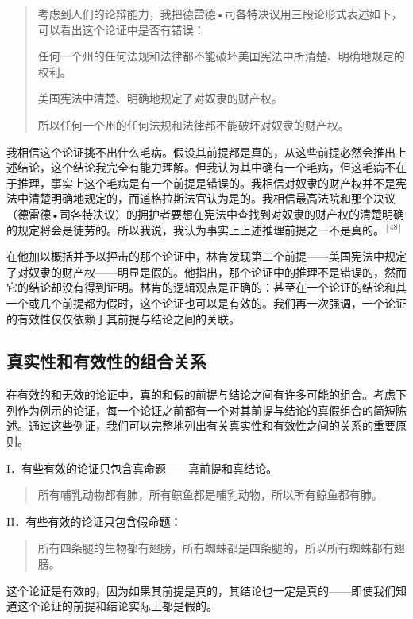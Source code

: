 \begin{quotation}
考虑到人们的论辩能力，我把德雷德•司各特决议用三段论形式表述如下，可以看出这个论证中是否有错误：

任何一个州的任何法规和法律都不能破坏美国宪法中所清楚、明确地规定的权利。

美国宪法中清楚、明确地规定了对奴隶的财产权。

所以任何一个州的任何法规和法律都不能破坏对奴隶的财产权。
\end{quotation}

我相信这个论证挑不出什么毛病。假设其前提都是真的，从这些前提必然会推出上述结论，这个结论我完全有能力理解。但我认为其中确有一个毛病，但这毛病不在于推理，事实上这个毛病是有一个前提是错误的。我相信对奴隶的财产权并不是宪法中清楚明确地规定的，而道格拉斯法官认为是的。我相信最高法院和那个决议（德雷德•司各特决议）的拥护者要想在宪法中查找到对奴隶的财产权的清楚明确的规定将会是徒劳的。所以我说，我认为事实上上述推理前提之一不是真的。$^{[48]}$

在他加以概括并予以抨击的那个论证中，林肯发现第二个前提——美国宪法中规定了对奴隶的财产权——明显是假的。他指出，那个论证中的推理不是错误的，然而它的结论却没有得到证明。林肯的逻辑观点是正确的：甚至在一个论证的结论和其一个或几个前提都为假时，这个论证也可以是有效的。我们再一次强调，一个论证的有效性仅仅依赖于其前提与结论之间的关联。

\subsection{真实性和有效性的组合关系}

在有效的和无效的论证中，真的和假的前提与结论之间有许多可能的组合。考虑下列作为例示的论证，每一个论证之前都有一个对其前提与结论的真假组合的简短陈述。通过这些例证，我们可以完整地列出有关真实性和有效性之间的关系的重要原则。

I．有些有效的论证只包含真命题——真前提和真结论。

\begin{quotation}
所有哺乳动物都有肺，所有鲸鱼都是哺乳动物，所以所有鲸鱼都有肺。
\end{quotation}

II．有些有效的论证只包含假命题：

\begin{quotation}
所有四条腿的生物都有翅膀，所有蜘蛛都是四条腿的，所以所有蜘蛛都有翅膀。
\end{quotation}

这个论证是有效的，因为如果其前提是真的，其结论也一定是真的——即使我们知道这个论证的前提和结论实际上都是假的。

